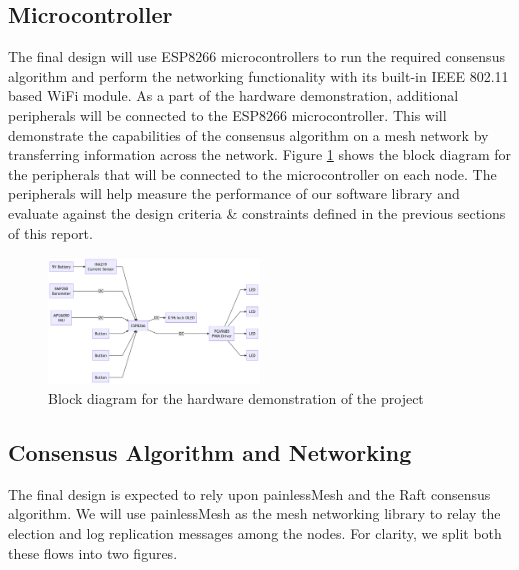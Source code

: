 \vspace{-25pt}
\subsection{Microcontroller}
The final design will use ESP8266 microcontrollers to run the required consensus algorithm and perform the networking functionality with its built-in IEEE 802.11 based WiFi module. As a part of the hardware demonstration, additional peripherals will be connected to the ESP8266 microcontroller. This will demonstrate the capabilities of the consensus algorithm on a mesh network by transferring information across the network. Figure \ref{fig:final_design_prototype} shows the block diagram for the peripherals that will be connected to the microcontroller on each node. The peripherals will help measure the performance of our software library and evaluate against the design criteria \& constraints defined in the previous sections of this report.

\begin{figure}[H]
    \centering
    \includegraphics[width=0.5\textwidth]{final-proposal/images/final_design_prototype.png}
    \caption{Block diagram for the hardware demonstration of the project}
    \label{fig:final_design_prototype}
    


  
\end{figure}


\subsection{Consensus Algorithm and Networking}
The final design is expected to rely upon painlessMesh and the Raft consensus algorithm. We will use painlessMesh as the mesh networking library to relay the election and log replication messages among the nodes. For clarity, we split both these flows into two figures.

